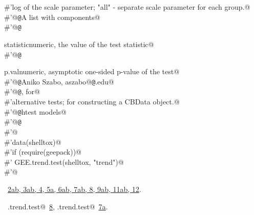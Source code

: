 \documentclass[reqno]{amsart}
\renewcommand{\NWlink}[2]{\hyperlink{#1}{#2}}
\begin{document}
\begin{flushleft}
\begin{list}{}{}
\mbox{}\verb@#'log of the scale parameter; "all" - separate scale parameter for each group.@\\
\mbox{}\verb@#'@{\tt @}\verb@return A list with components@\\
\mbox{}\verb@#'@{\tt @}\verb@return \item{statistic}{numeric, the value of the test statistic}@\\
\mbox{}\verb@#'@{\tt @}\verb@return \item{p.val}{numeric, asymptotic one-sided p-value of the test}@\\
\mbox{}\verb@#'@{\tt @}\verb@author Aniko Szabo, aszabo@{\tt @}\verb@mcw.edu@\\
\mbox{}\verb@#'@{\tt @}\verb@seealso {},  for@\\
\mbox{}\verb@#'alternative tests;  for constructing a CBData object.@\\
\mbox{}\verb@#'@{\tt @}\verb@keywords htest models@\\
\mbox{}\verb@#'@{\tt @}\verb@examples@\\
\mbox{}\verb@#'@\\
\mbox{}\verb@#'data(shelltox)@\\
\mbox{}\verb@#'if (require(geepack)){@\\
\mbox{}\verb@#'  GEE.trend.test(shelltox, "trend")@\\
\mbox{}\verb@#'}@\\
\mbox{}\verb@@{\NWsep}
\end{list}
\vspace{-1.5ex}
\footnotesize
\begin{list}{}{\setlength{\itemsep}{-\parsep}\setlength{\itemindent}{-\leftmargin}}
\item \NWtxtFileDefBy\ \NWlink{nuweb2a}{2a}\NWlink{nuweb2b}{b}\NWlink{nuweb3a}{, 3a}\NWlink{nuweb3b}{b}\NWlink{nuweb4}{, 4}\NWlink{nuweb5a}{, 5a}\NWlink{nuweb6a}{, 6a}\NWlink{nuweb6b}{b}\NWlink{nuweb7a}{, 7a}\NWlink{nuweb7b}{b}\NWlink{nuweb8}{, 8}\NWlink{nuweb9a}{, 9a}\NWlink{nuweb9b}{b}\NWlink{nuweb11a}{, 11a}\NWlink{nuweb11b}{b}\NWlink{nuweb12}{, 12}.
\item \NWtxtIdentsUsed\nobreak\  \verb@GEE.trend.test@\nobreak\ \NWlink{nuweb8}{8}, \verb@RS.trend.test@\nobreak\ \NWlink{nuweb7a}{7a}.
\item{}
\end{list}
\vspace{4ex}
\end{flushleft}
\end{document}
